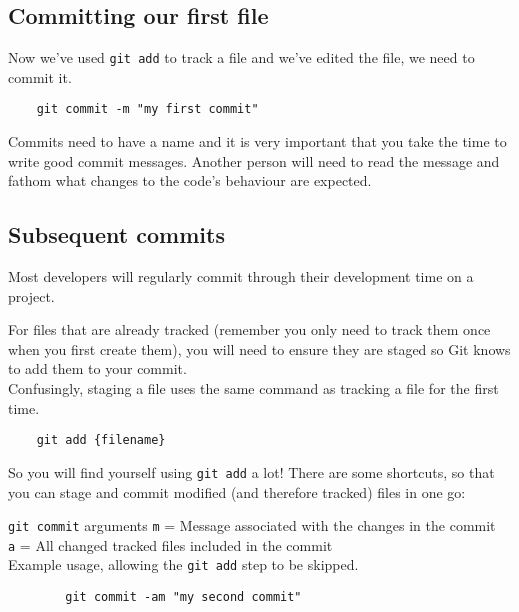 \subsection{Committing our first file}

Now we've used \texttt{git add} to track a file and we've edited the file, we need to commit it.

\begin{verbatim}
    git commit -m "my first commit"
\end{verbatim}

Commits need to have a name and it is very important that you take the time to write good commit messages. Another person will need to read the message and fathom what changes to the code's behaviour are expected.
\\


\subsection{Subsequent commits}

Most developers will regularly commit through their development time on a project.

For files that are already tracked (remember you only need to track them once when you first create them), you will need to ensure they are staged so Git knows to add them to your commit.
\\

Confusingly, staging a file uses the same command as tracking a file for the first time.
\\

\begin{verbatim}
    git add {filename}
\end{verbatim}

So you will find yourself using \texttt{git add} a lot! There are some shortcuts, so that you can stage and commit modified (and therefore tracked) files in one go:

\begin{infobox}{\texttt{git commit} arguments}
    \texttt{m} = Message associated with the changes in the commit
    \\
    \texttt{a} = All changed tracked files included in the commit
    \\

    Example usage, allowing the \texttt{git add} step to be skipped.

    \begin{verbatim}
        git commit -am "my second commit"
    \end{verbatim}
\end{infobox}

